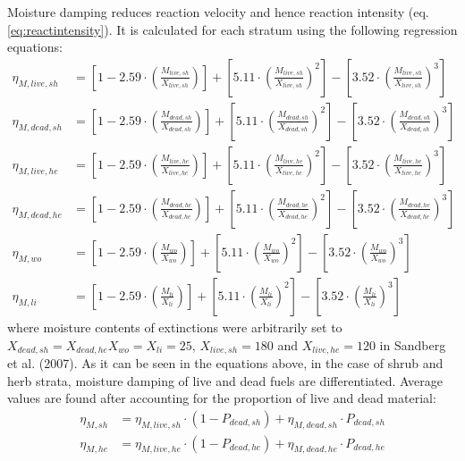 \documentclass[]{book}
\begin{document}
Moisture damping reduces reaction velocity and hence reaction intensity (eq. \eqref{eq:reactintensity}). It is calculated for each stratum using the following regression equations:
\begin{eqnarray}
\eta_{M, live, sh} &= \left[1-2.59\cdot \left(\frac{M_{live, sh}}{X_{live, sh}}\right)\right] +\left[ 5.11\cdot \left(\frac{M_{live, sh}}{X_{live, sh}}\right)^2\right]-\left[ 3.52\cdot \left(\frac{M_{live, sh}}{X_{live, sh}}\right)^3\right] \\
\eta_{M, dead, sh} &= \left[1-2.59\cdot \left(\frac{M_{dead, sh}}{X_{dead, sh}}\right)\right] +\left[ 5.11\cdot \left(\frac{M_{dead, sh}}{X_{dead, sh}}\right)^2\right]-\left[ 3.52\cdot \left(\frac{M_{dead, sh}}{X_{dead, sh}}\right)^3\right] \\
\eta_{M, live, he} &= \left[1-2.59\cdot \left(\frac{M_{live, he}}{X_{live, he}}\right)\right] +\left[ 5.11\cdot \left(\frac{M_{live, he}}{X_{live, he}}\right)^2\right]-\left[ 3.52\cdot \left(\frac{M_{live, he}}{X_{live, he}}\right)^3\right] \\
\eta_{M, dead, he} &= \left[1-2.59\cdot \left(\frac{M_{dead, he}}{X_{dead, he}}\right)\right] +\left[ 5.11\cdot \left(\frac{M_{dead, he}}{X_{dead, he}}\right)^2\right]-\left[ 3.52\cdot \left(\frac{M_{dead, he}}{X_{dead, he}}\right)^3\right] \\
\eta_{M, wo} &= \left[1-2.59\cdot \left(\frac{M_{wo}}{X_{wo}}\right)\right] +\left[ 5.11\cdot \left(\frac{M_{wo}}{X_{wo}}\right)^2\right]-\left[ 3.52\cdot \left(\frac{M_{wo}}{X_{wo}}\right)^3\right] \\
\eta_{M, li} &= \left[1-2.59\cdot \left(\frac{M_{li}}{X_{li}}\right)\right] +\left[ 5.11\cdot \left(\frac{M_{li}}{X_{li}}\right)^2\right]-\left[ 3.52\cdot \left(\frac{M_{li}}{X_{li}}\right)^3\right] 
\label{eq:moistdamp}
\end{eqnarray}
where moisture contents of extinctions were arbitrarily set to \(X_{dead, sh} = X_{dead, he} X_{wo} = X_{li} = 25\), \(X_{live, sh} = 180\) and \(X_{live, he} = 120\) in Sandberg et al. (2007). As it can be seen in the equations above, in the case of shrub and herb strata, moisture damping of live and dead fuels are differentiated. Average values are found after accounting for the proportion of live and dead material:
\begin{eqnarray}
\eta_{M, sh} &= \eta_{M, live, sh} \cdot (1 - P_{dead, sh})+ \eta_{M, dead, sh} \cdot P_{dead, sh}\\
\eta_{M, he} &= \eta_{M, live, he} \cdot (1 - P_{dead, he})+ \eta_{M, dead, he} \cdot P_{dead, he}
\end{eqnarray}
\end{document}
